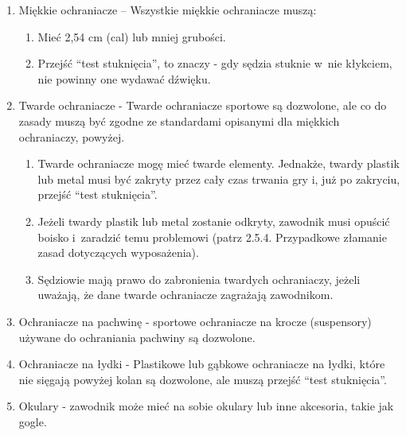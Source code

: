 \documentclass[12pt]{article}
\begin{document}
\begin{enumerate}
	\item
	      Miękkie ochraniacze -- Wszystkie miękkie ochraniacze muszą:

	      \begin{enumerate}
		      \item
		            Mieć 2,54 cm (cal) lub mniej grubości.
		      \item
		            Przejść ``test stuknięcia'', to znaczy - gdy sędzia stuknie w~nie
		            kłykciem, nie powinny one wydawać dźwięku.
	      \end{enumerate}
	\item
	      Twarde ochraniacze - Twarde ochraniacze sportowe są
	      dozwolone, ale co do zasady muszą być zgodne ze standardami opisanymi
	      dla miękkich ochraniaczy, powyżej.

	      \begin{enumerate}
		      \item
		            Twarde ochraniacze mogę mieć twarde elementy. Jednakże, twardy
		            plastik lub metal musi być zakryty przez cały czas trwania gry i,
		            już po zakryciu, przejść ``test stuknięcia''.
		      \item
		            Jeżeli twardy plastik lub metal zostanie odkryty, zawodnik musi
		            opuścić boisko i~zaradzić temu problemowi (patrz 2.5.4. Przypadkowe
		            złamanie zasad dotyczących wyposażenia).
		      \item
		            Sędziowie mają prawo do zabronienia twardych ochraniaczy, jeżeli
		            uważają, że dane twarde ochraniacze zagrażają zawodnikom.
	      \end{enumerate}
	\item
	      Ochraniacze na pachwinę - sportowe ochraniacze na krocze
	      (suspensory) używane do ochraniania pachwiny są dozwolone.
	\item
	      Ochraniacze na łydki - Plastikowe lub gąbkowe ochraniacze na
	      łydki, które nie sięgają powyżej kolan są dozwolone, ale muszą przejść
	      ``test stuknięcia''.
	\item
	      Okulary - zawodnik może mieć na sobie okulary lub inne
	      akcesoria, takie jak gogle.


\end{enumerate}
\end{document}
